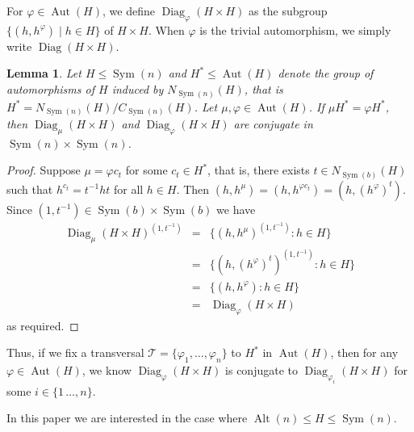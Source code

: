 \documentclass[11pt]{amsart}
\newtheorem{lemma}[theorem]{Lemma}
\DeclareMathOperator{\Sym}{Sym}
\DeclareMathOperator{\Alt}{Alt}
\DeclareMathOperator{\Aut}{Aut}
\DeclareMathOperator{\Diag}{Diag}
\begin{document}
For $\varphi\in\Aut(H)$, we define 
$\Diag_\varphi(H\times H)$ as the subgroup $\{(h,h^\varphi) \mid h\in H\}$ of $H\times H$.
When $\varphi$ is the trivial automorphism, we simply write $\Diag(H\times H)$.




\begin{lemma}\label{lem:diag_rep_enough}
Let $H \leqslant \Sym(n)$ and $H^*\leqslant \Aut(H)$  denote the group of automorphisms of $H$ induced by $N_{\Sym(n)}(H)$, that is $H^*=N_{\Sym(n)}(H)/C_{\Sym(n)}(H)$.
Let $\mu, \varphi \in \Aut(H)$. If $\mu H^*=\varphi H^*$, then $\Diag_\mu(H\times H)$ and $\Diag_\varphi(H\times H)$ are conjugate in $\Sym(n)\times \Sym(n)$.  
\end{lemma}
\begin{proof}
    Suppose $\mu = \varphi c_t$ for some \(c_t\in H^*\), that is,  there exists \(t\in N_{\Sym(b)}(H)\) such that \(h^{c_t}=t^{-1}ht\) for all \(h\in H\). Then $(h,h^\mu) = (h,h^{\varphi c_t})=(h,(h^\varphi)^t)$. Since $(1,t^{-1}) \in \Sym(b)\times\Sym(b)$ we have 
%
\begin{eqnarray*}
    \Diag_\mu(H\times H)^{(1,t^{-1})} &= & \{ (h,h^\mu)^{(1,t^{-1})} : h\in H \} \\
    &=& \{ (h,(h^\varphi)^t)^{(1,t^{-1})} : h\in H \}\\
    &=& \{ (h,h^\varphi) : h\in H \}\\
    &=& \Diag_\varphi(H\times H) 
\end{eqnarray*}
as required.
\end{proof}

Thus, if we fix a transversal $\mathcal T = \{\varphi_1,\ldots,\varphi_n\}$ to $H^*$ in $\Aut(H)$, then for any $\varphi \in \Aut(H)$, we know $ \Diag_\varphi(H\times H)$ is conjugate to  $ \Diag_{\varphi_i}(H\times H)$ for some $i\in \{1\,\ldots,n\}$.

\medskip
In this paper we are interested in the case where $\Alt(n)\leqslant H\leqslant \Sym(n)$.
\end{document}
